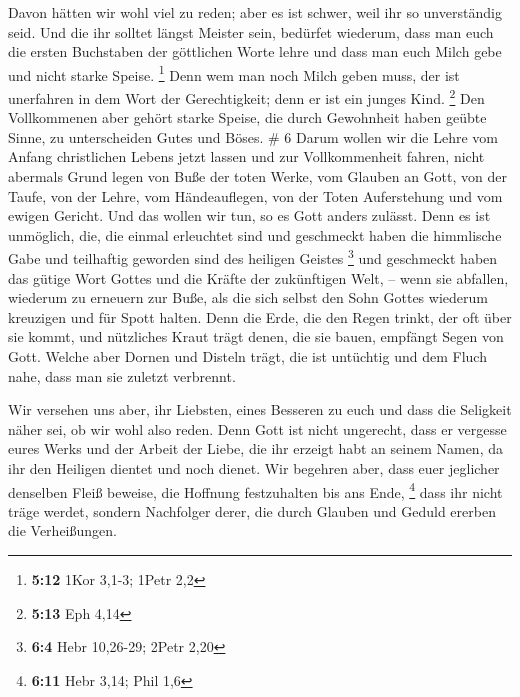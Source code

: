  Davon hätten wir wohl viel zu reden; aber es ist schwer,
weil ihr so unverständig seid.  Und die ihr solltet längst
Meister sein, bedürfet wiederum, dass man euch die ersten Buchstaben der
göttlichen Worte lehre und dass man euch Milch gebe und nicht starke
Speise. \footnote{\textbf{5:12} 1Kor 3,1-3; 1Petr 2,2} 
Denn wem man noch Milch geben muss, der ist unerfahren in dem Wort der
Gerechtigkeit; denn er ist ein junges Kind. \footnote{\textbf{5:13} Eph
  4,14}  Den Vollkommenen aber gehört starke Speise, die
durch Gewohnheit haben geübte Sinne, zu unterscheiden Gutes und Böses.
\# 6  Darum wollen wir die Lehre vom Anfang christlichen
Lebens jetzt lassen und zur Vollkommenheit fahren, nicht abermals Grund
legen von Buße der toten Werke, vom Glauben an Gott,  von
der Taufe, von der Lehre, vom Händeauflegen, von der Toten Auferstehung
und vom ewigen Gericht.  Und das wollen wir tun, so es Gott
anders zulässt.  Denn es ist unmöglich, die, die einmal
erleuchtet sind und geschmeckt haben die himmlische Gabe und teilhaftig
geworden sind des heiligen Geistes \footnote{\textbf{6:4} Hebr 10,26-29;
  2Petr 2,20}  und geschmeckt haben das gütige Wort Gottes
und die Kräfte der zukünftigen Welt, --  wenn sie abfallen,
wiederum zu erneuern zur Buße, als die sich selbst den Sohn Gottes
wiederum kreuzigen und für Spott halten.  Denn die Erde, die
den Regen trinkt, der oft über sie kommt, und nützliches Kraut trägt
denen, die sie bauen, empfängt Segen von Gott.  Welche aber
Dornen und Disteln trägt, die ist untüchtig und dem Fluch nahe, dass man
sie zuletzt verbrennt.

 Wir versehen uns aber, ihr Liebsten, eines Besseren zu euch
und dass die Seligkeit näher sei, ob wir wohl also reden. 
Denn Gott ist nicht ungerecht, dass er vergesse eures Werks und der
Arbeit der Liebe, die ihr erzeigt habt an seinem Namen, da ihr den
Heiligen dientet und noch dienet.  Wir begehren aber, dass
euer jeglicher denselben Fleiß beweise, die Hoffnung festzuhalten bis
ans Ende, \footnote{\textbf{6:11} Hebr 3,14; Phil 1,6} 
dass ihr nicht träge werdet, sondern Nachfolger derer, die durch Glauben
und Geduld ererben die Verheißungen.

